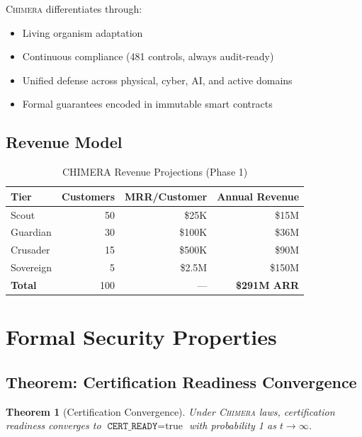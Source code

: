 \documentclass[12pt]{article}
\newtheorem{theorem}{Theorem}
\newcommand{\CHIMERA}{\textsc{Chimera}}
\begin{document}
\CHIMERA{} differentiates through:
\begin{itemize}[nosep]
  \item Living organism adaptation
  \item Continuous compliance (481 controls, always audit-ready)
  \item Unified defense across physical, cyber, AI, and active domains
  \item Formal guarantees encoded in immutable smart contracts
\end{itemize}

\subsection{Revenue Model}

\begin{table}[htbp]
\centering
\caption{CHIMERA Revenue Projections (Phase 1)}
\begin{tabular}{lrrr}
\toprule
\textbf{Tier} & \textbf{Customers} & \textbf{MRR/Customer} & \textbf{Annual Revenue} \\
\midrule
Scout & 50 & \$25K & \$15M \\
Guardian & 30 & \$100K & \$36M \\
Crusader & 15 & \$500K & \$90M \\
Sovereign & 5 & \$2.5M & \$150M \\
\midrule
\textbf{Total} & 100 & — & \textbf{\$291M ARR} \\
\bottomrule
\end{tabular}
\end{table}

\section{Formal Security Properties}
\label{sec:formal}

\subsection{Theorem: Certification Readiness Convergence}

\begin{theorem}[Certification Convergence]
Under \CHIMERA{} laws, certification readiness converges to $\texttt{CERT\_READY} = \text{true}$ with probability 1 as $t \to \infty$.
\end{theorem}
\end{document}
